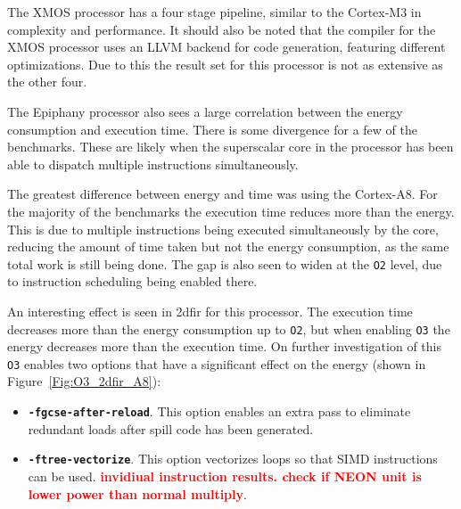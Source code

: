 \documentclass[twocolumn]{article}
\newcommand{\todo}[1]{\textbf{\textcolor{red}{#1}}}
\begin{document}
The XMOS processor has a four stage pipeline, similar to the Cortex-M3 in complexity and performance. It should also be noted that the compiler for the XMOS processor uses an LLVM backend for code generation, featuring different optimizations. Due to this the result set for this processor is not as extensive as the other four.

The Epiphany processor also sees a large correlation between the energy consumption and execution time. There is some divergence for a few of the benchmarks. These are likely when the superscalar core in the processor has been able to dispatch multiple instructions simultaneously.

The greatest difference between energy and time was using the Cortex-A8. For the majority of the benchmarks the execution time reduces more than the energy. This is due to multiple instructions being executed simultaneously by the core, reducing the amount of time taken but not the energy consumption, as the same total work is still being done. The gap is also seen to widen at the \texttt{O2} level, due to instruction scheduling being enabled there.

An interesting effect is seen in 2dfir for this processor. The execution time decreases more than the energy consumption up to \texttt{O2}, but when enabling \texttt{O3} the energy decreases more than the execution time. On further investigation of this \texttt{O3} enables two options that have a significant effect on the energy (shown in Figure~\ref{Fig:O3_2dfir_A8}):
\begin{itemize}
	\item \texttt{\bfseries -fgcse-after-reload}. This option enables an extra pass to eliminate redundant loads after spill code has been generated.
	\item \texttt{\bfseries -ftree-vectorize}. This option vectorizes loops so that SIMD instructions can be used. \todo{invidiual instruction results. check if NEON unit is lower power than normal multiply}.
\end{itemize}

\end{document}
